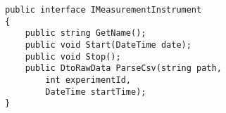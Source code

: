 \begin{lstlisting}[caption=The interface used to implement the measuring instruments, label={lst:measurement_instruments}]
public interface IMeasurementInstrument
{
    public string GetName();
    public void Start(DateTime date);
    public void Stop();
    public DtoRawData ParseCsv(string path, 
        int experimentId, 
        DateTime startTime);
}
\end{lstlisting}